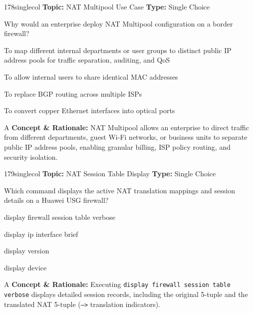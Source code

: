 \begin{qcard}{178}{singlecol}
\textcolor{darkslate!75}{\small\textbf{Topic:} NAT Multipool Use Case \hfill \textbf{Type:} Single Choice}\vspace{0.4em}\par
Why would an enterprise deploy NAT Multipool configuration on a border firewall?
\begin{qoptions}
\item To map different internal departments or user groups to distinct public IP address pools for traffic separation, auditing, and QoS
\item To allow internal users to share identical MAC addresses
\item To replace BGP routing across multiple ISPs
\item To convert copper Ethernet interfaces into optical ports
\end{qoptions}
\end{qcard}
\nopagebreak
\begin{explainbox}{A}
\textbf{Concept \& Rationale:} NAT Multipool allows an enterprise to direct traffic from different departments, guest Wi-Fi networks, or business units to separate public IP address pools, enabling granular billing, ISP policy routing, and security isolation.
\end{explainbox}

\begin{qcard}{179}{singlecol}
\textcolor{darkslate!75}{\small\textbf{Topic:} NAT Session Table Display \hfill \textbf{Type:} Single Choice}\vspace{0.4em}\par
Which command displays the active NAT translation mappings and session details on a Huawei USG firewall?
\begin{qoptions}
\item display firewall session table verbose
\item display ip interface brief
\item display version
\item display device
\end{qoptions}
\end{qcard}
\nopagebreak
\begin{explainbox}{A}
\textbf{Concept \& Rationale:} Executing \texttt{display firewall session table verbose} displays detailed session records, including the original 5-tuple and the translated NAT 5-tuple (\texttt{--\textgreater{}} translation indicators).
\end{explainbox}

